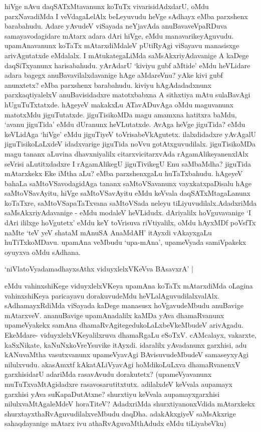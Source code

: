 \noindent
hiVge nAvu daqSATxMtavanunx koTuTx vivarisidAdxdarU, oMdu parxNavadiMda I veVdagaLelAlx beLeyu\-vudu heVge sAdhayx eMba parxshenx barabahudu. Adare yAvudeV viSayada neYjavAda anuBavaveVpaR\-Duva samayavodagidare mAtarx adara dAri hiVge, eMdu manavarikeyAguvudu. upamAna\-vanunx koTaTx mAtarxdiMdaleV pUtiR\-yAgi viSayavu manasisxge arivAgutatxde eMdalalx. I mAtukatega\-LiMda saMsAkxri\-yAdavanige A kaDege daqSiTxyanunx harisabahudu. yArAdarU `kiviyu gubf aMtide' eMdu heVLidare adara bagegx anuBavavilalxdavanige hAge aMdareVnu? yAke kivi gubf anunxtetx? eMba parxshenx barabahudu. kiviyu hAgAdadadxnunx parxkaqtiyalelxV anuBavisidadxre matotxbabxna A sithxtiya mAtu sulaBa\-vAgi hUguTuTxtatxde. hAgeyeV makakxLu ATavADuvAga oMdu maguvanunx matotxMdu jiguTu\-tatxde. jiguTisikoMDa magu amamxna hatitxra baMdu, `avanu jiguTida' eMdu dUranunx heVLutatxde. AvAga\- heVge jiguTida? eMdu keVLidAga `hiVge' eMdu jiguTiyeV toVrisabeVkAgutetx. ilalxdi\-dadxre yAvA\-galU jiguTisikoLaLxdeV idadx\-varige jiguTida noVvu gotAtxguvudilalx. jiguTisikoMDa magu tananx aLu\-vina dhavxni\-yalilx citarxvicitarxvAda rAgamAlikeyanenxlAlx seVrisi aLutitxdadxre I rAgamAlikegU jiguTivikegU Enu saMbaMdha? jiguTida mAtarxkekx Eke iMtha aLu? eMba parxshenx\-gaLu huTaTxbahudu. hAgeyeV bahaLa\- saMtoVSavodagidAga tananx saMtoVSavanunx vayxkatxpaDisalu hAge saMtoVSavAyitu, hiVge saMtoVSa\-vAyitu eMdu keVvala daqSATxMtagaLanunx koTaTxre, saMtoVSapaTaTxvana saMtoVSada neleyu tiLiyuvu\-dilalx.\break AdadxriMda saMsAkxriyAdavanige - eMdu modaleV heVLidudx. dAriyalilx hoVgu\-vavanige `I dAri ililxge hoVgutetx' eMdu keY toVrisuva riVtiyalilx, oMdu hAyxMDf poVsfTx naMte `teV yeV shataM mAnuSA AnaMdAH'\label{166} itAyxdi vAkayxgaLu huTiTxkoMDavu. upamAna veMbudu `upa-mAna', upa\-meVyada samiVpakekx oyuyxva oMdu sAdhana.

\medskip
\begin{shloka}
`niVlatoVyadamadhayxsAthx viduyxlelxVKeVva BAsavxrA' |\label{166}
\end{shloka}
\smallskip

\noindent
eMdu vahinxshiKege viduyxlelxVKeya upamAna koTaTx mAtarxdiMda oLagina vahinx\break\-shiKeya paricayavu dorakuvudeMdu heVLalAguvudilalxvalAlx. sAdhamayxRdiMda viSayada kaDege manasusx hoVgavudeMbudu anuBavige mAtarxveV. ananu\-Bavige upamAnadalilx kaMDa yAva dhamaRvanunx upameVyakekx samAna dhamaRvAgi\break tegedu\-koLaLxbeVkeMbudeV arivAgadu. EkeMdare- viduyxlelxVKeyalilxruva dhamaR\-gaLu eSoTxV.\- cAMcalayx, vakarxte, kaSxNikate, kaNuNxkoVreYsuvike itAyxdi. idaralilx yAva\-danunx garxhisi, adu kANuvaMtha vasutx\-vanunx upameVyavAgi BAvisuvudeMbudeV samaseyxyAgi nilulxvudu. akasAmxtf kAka\-tALiVya\-vAgi hoMdikoLuLxva dhamaRvanenxV garxhisidarU adariMda rasavAvudu dorakutetx? (upameVyavanunx muTuTx\-vaMtA\-gidadxre rasa\-vosarutitxtutx. adilalxdeV keVvala aupamayx garxhisi yAva suKapaDutAtxne? shurxtiyu keVvala aupamayxgarxhisi nilulxvaMtAgaleMdeV horaTiteV? AdadxriMda shurxtiyanonxVdida mAtarxkekx shurxtayxthaR\-vAguvudilalxveMbudu daqDha. adakAkxgiyeV saMsAkxrige sahaqdayanige mAtarx ivu athaRvAgu\-vaMthAdudx eMdu tiLiyabeVku)

